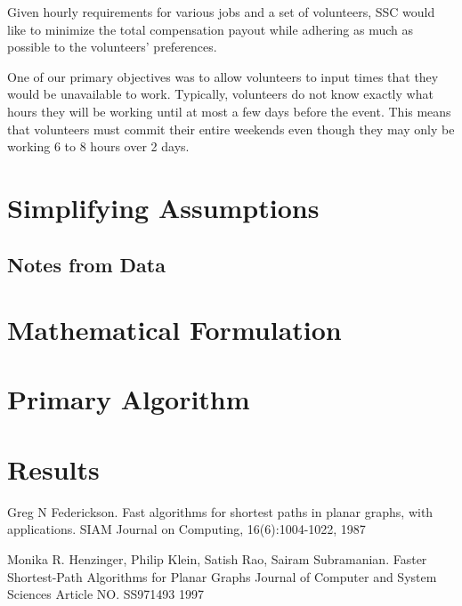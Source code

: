 \documentclass[12pt]{article}
\theoremstyle{definition}
\begin{document}
Given hourly requirements for various jobs and a set of volunteers, SSC would like to minimize the total compensation payout while adhering as much as possible to the volunteers’ preferences.

One of our primary objectives was to allow volunteers to input times that they would be unavailable to work.
Typically, volunteers do not know exactly what hours they will be working until at most a few days before the event.
This means that volunteers must commit their entire weekends even though they may only be working 6 to 8 hours over 2 days.



\section{Simplifying Assumptions}

\subsection{Notes from Data}

\section{Mathematical Formulation}

\section{Primary Algorithm}

\section{Results}

\begin{thebibliography}{9}
	Greg N Federickson.
	Fast algorithms for shortest paths in planar graphs, with applications.
	SIAM Journal on Computing, 16(6):1004-1022,
	1987

	Monika R. Henzinger, Philip Klein, Satish Rao, Sairam Subramanian.
	Faster Shortest-Path Algorithms for Planar Graphs
	Journal of Computer and System Sciences Article NO. SS971493
	1997

\end{thebibliography}
\end{document}
